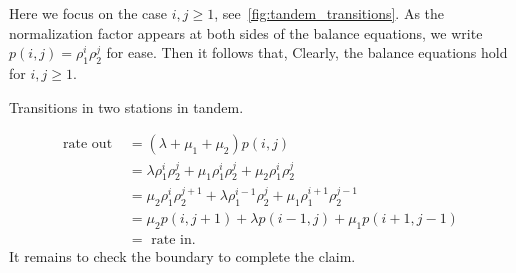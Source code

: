 Here we focus on the case $i, j \geq 1$, see~\cref{fig:tandem_transitions}.
As the normalization factor appears at both sides of the balance equations, we write $p(i,j) = \rho_1^i \rho_2^j$ for ease. Then it follows that,
Clearly, the balance equations hold for $i, j \geq 1$.
\begin{marginfigure}
 \caption{Transitions in  two stations in tandem.}
 \label{fig:tandem_transitions}
\end{marginfigure}
\begin{align*}
    \text{rate out } &=(\lambda + \mu_1 + \mu_2) p(i, j) \\
    &= \lambda  \rho_1^i \rho_2^j + \mu_1 \rho_1^{i} \rho_2^j + \mu_2 \rho_1^i\rho_2^j\\
    &=\mu_2 \rho_1^{i} \rho_2^{j+1} + \lambda \rho_1^{i-1} \rho_2^j + \mu_1 \rho_1^{i+1}\rho_2^{j-1}\\
                     &= \mu_2p(i, j+1) + \lambda p(i-1, j) + \mu_1 p(i+1, j-1)\\
    &= \text{ rate in}.
\end{align*}
It remains to check  the boundary to complete the claim.




